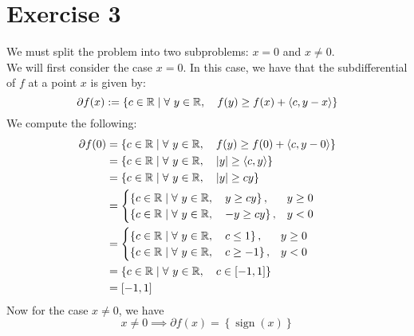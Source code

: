 \documentclass[12pt]{article}
\begin{document}
\section{Exercise 3}
\label{ex3}
We must split the problem into two subproblems: $x = 0$ and $x \neq 0$. \\
We will first consider the case $x = 0$. In this case, we have that the subdifferential of $f$ at a point $x$ is given by:
\begin{equation}
  \label{eq: subdifferential}
  \partial f(x) := \left\{ c \in \mathbb{R} \mid \forall\ y \in \mathbb{R}, \quad f(y) \geq f(x) + \langle c, y - x \rangle \right\}
\end{equation}
We compute the following:
\begin{align*}
  \partial f(0)
   & = \left\{ c \in \mathbb{R} \mid \forall\ y \in \mathbb{R}, \quad f(y) \geq f(0) + \langle c, y - 0 \rangle \right\} \\
   & = \left\{ c \in \mathbb{R} \mid \forall\ y \in \mathbb{R}, \quad |y| \geq \langle c, y \rangle \right\}             \\
   & = \left\{ c \in \mathbb{R} \mid \forall\ y \in \mathbb{R}, \quad |y| \geq cy \right\}                               \\
   & =
  \begin{cases}
    \left\{ c \in \mathbb{R} \mid \forall\ y \in \mathbb{R}, \quad y \geq cy \right\},  & y \geq 0 \\
    \left\{ c \in \mathbb{R} \mid \forall\ y \in \mathbb{R}, \quad -y \geq cy \right\}, & y < 0
  \end{cases}                                                                              \\
   & =
  \begin{cases}
    \left\{ c \in \mathbb{R} \mid \forall\ y \in \mathbb{R}, \quad c \leq 1 \right\},  & y \geq 0 \\
    \left\{ c \in \mathbb{R} \mid \forall\ y \in \mathbb{R}, \quad c \geq -1 \right\}, & y < 0
  \end{cases}                                                                              \\
   & = \left\{ c \in \mathbb{R} \mid \forall\ y \in \mathbb{R}, \quad c \in [-1, 1] \right\}                             \\
   & = [-1, 1]
\end{align*}
Now for the case $x \neq 0$, we have
$$
  x \neq 0 \implies \partial f(x) = \left\{ \operatorname{sign}(x) \right\}
$$
\end{document}
